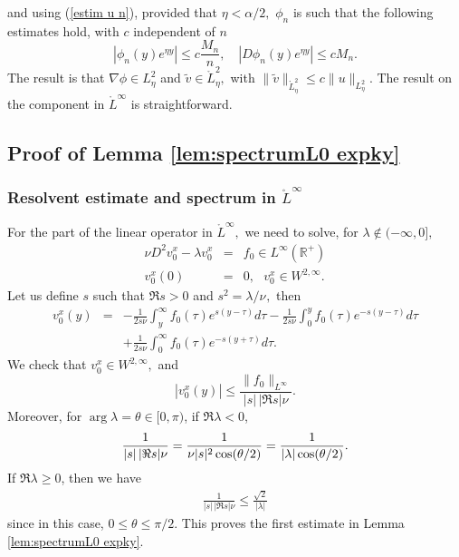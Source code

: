 \documentclass[11pt]{article}
\begin{document}
and using (\ref{estim u n}), provided that $\eta<\alpha /2,$ $\phi _{n}$ is
such that the following estimates hold, with $c$ independent of $n$%
\begin{equation*}
|\phi _{n}(y)e^{\eta y}|\leq c\frac{M_{n}}{n},\quad |D\phi _{n}(y)e^{\eta y}|\leq
cM_{n}.
\end{equation*}%
The result is that $\nabla \phi \in L_{\eta}^{2}$ and $\widetilde{v}\in \mathring{L}_{\eta}^{2},$ with
$\|\widetilde{v}\|_{\mathring{L}_{\eta}^{2}}\leq c\|u\|_{L_{\eta}^{2}}$.
The result on the component in $\mathring{L}^{\infty }$ is straightforward.





\subsection{Proof of Lemma \protect\ref{lem:spectrumL0 expky}}


\label{proof2}



\subsubsection{Resolvent estimate and spectrum in $\mathring{L}^{\infty }$}



For the part of the linear operator in $\mathring{L}^{\infty },$ we need to
solve, for $\lambda \notin (-\infty ,0],$%
\begin{eqnarray*}
\nu D^{2}v_{0}^{x}-\lambda v_{0}^{x} &=&f_{0}\in L^{\infty }(\mathbb{R}^{+})
\\
v_{0}^{x}(0) &=&0,\text{ }v_{0}^{x}\in W^{2,\infty }.
\end{eqnarray*}%
Let us define $s$ such that $\Re s>0$ and $s^{2}=\lambda /\nu _{},$ then%
\begin{eqnarray*}
v_{0}^{x}(y) &=&-\frac{1}{2s\nu }\int_{y}^{\infty }f_{0}(\tau )e^{s(y-\tau
)}d\tau -\frac{1}{2s\nu }\int_{0}^{y}f_{0}(\tau )e^{-s(y-\tau )}d\tau \\
&&+\frac{1}{2s\nu }\int_{0}^{\infty }f_{0}(\tau )e^{-s(y+\tau )}d\tau .
\end{eqnarray*}%
We check that $v_{0}^{x}\in W^{2,\infty },$
and 
\begin{equation*}
|v_{0}^{x}(y)|\leq \frac{\|f_{0}\|_{L^{\infty} }}{|s| \, |\Re s|\nu}.
\end{equation*}%
Moreover, for $\arg \lambda =\theta \in \lbrack 0,\pi )$, if $\Re \lambda <0$,
\begin{eqnarray*}
\frac{1}{|s| \, |\Re s|\nu } = {1 \over \nu |s|^2 \cos (\theta/2)} = {1 \over |\lambda| \cos(\theta/2)}.
\end{eqnarray*}%
If $\Re \lambda \ge 0$, then we have
\begin{eqnarray*}
\frac{1}{|s| \, |\Re s|\nu } 
\leq \frac{\sqrt{2}}{|\lambda |}
\end{eqnarray*}%
since in this case, $0 \le \theta \le \pi / 2$.
This proves the first estimate in Lemma \ref{lem:spectrumL0 expky}.
\end{document}
